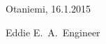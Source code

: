 \documentclass[english,12pt,a4paper,pdftex,elec,utf8]{aaltothesis}
\begin{document}
\vspace{5cm}
Otaniemi, 16.1.2015

\vspace{5mm}
{\hfill Eddie E.\ A.\ Engineer \hspace{1cm}}

\newpage


\thesistableofcontents







\end{document}
